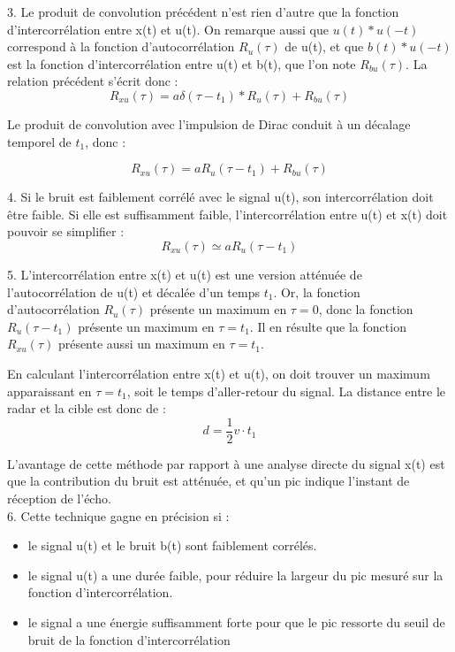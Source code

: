 \documentclass[11pt]{report}
\begin{document}
	3. Le produit de convolution précédent n'est rien d'autre que la fonction d'intercorrélation entre x(t) et u(t). On remarque aussi que $u(t)*u(-t)$ correspond à la fonction d'autocorrélation $R_{u}(\tau)$ de u(t), et que $b(t)*u(-t)$ est la fonction d'intercorrélation entre u(t) et b(t), que l'on note $R_{bu}(\tau)$. La relation précédent s'écrit donc :
	\begin{equation*}
	R_{xu}(\tau)=a\delta(\tau-t_{1})*R_{u}(\tau)+R_{bu}(\tau)
	\end{equation*}
	
	Le produit de convolution avec l'impulsion de Dirac conduit à un décalage temporel de $t_{1}$, donc : 
	
	\begin{equation*}
	R_{xu}(\tau)=aR_{u}(\tau-t_{1})+R_{bu}(\tau)
	\end{equation*}
	
	4. Si le bruit est faiblement corrélé avec le signal u(t), son intercorrélation doit être faible. Si elle est suffisamment faible, l'intercorrélation entre u(t) et x(t) doit pouvoir se simplifier :
	\begin{equation*}
	R_{xu}(\tau) \simeq aR_{u}(\tau-t_{1})
	\end{equation*}
	
	5. L'intercorrélation entre x(t) et u(t) est une version atténuée de l'autocorrélation de u(t) et décalée d'un temps $t_{1}$. Or, la fonction d'autocorrélation $R_{u}(\tau)$ présente un maximum en $\tau=0$, donc la fonction $R_{u}(\tau-t_{1})$ présente un maximum en $\tau=t_{1}$. Il en résulte que la fonction $R_{xu}(\tau)$ présente aussi un maximum en $\tau=t_{1}$.
	
	En calculant l'intercorrélation entre x(t) et u(t), on doit trouver un maximum apparaissant en $\tau=t_{1}$, soit le temps d'aller-retour du signal. La distance entre le radar et la cible est donc de : 
	\begin{equation*}
	d=\frac{1}{2}v\cdot t_{1}
	\end{equation*}
	
	L'avantage de cette méthode par rapport à une analyse directe du signal x(t) est que la contribution du bruit est atténuée, et qu'un pic indique l'instant de réception de l'écho.\\
	
	6. Cette technique gagne en précision si :
	\begin{itemize}
		\item le signal u(t) et le bruit b(t) sont faiblement corrélés.
		\item le signal u(t) a une durée faible, pour réduire la largeur du pic mesuré sur la fonction d'intercorrélation.
		\item le signal a une énergie suffisamment forte pour que le pic ressorte du seuil de bruit de la fonction d'intercorrélation 
	\end{itemize}
	
\end{document}
